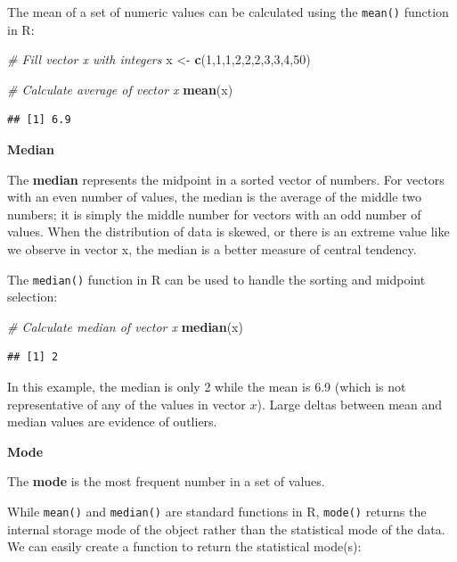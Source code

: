 \documentclass[]{book}
\newenvironment{Shaded}{\begin{snugshade}}{\end{snugshade}}
\newcommand{\CommentTok}[1]{\textcolor[rgb]{0.56,0.35,0.01}{\textit{#1}}}
\newcommand{\DecValTok}[1]{\textcolor[rgb]{0.00,0.00,0.81}{#1}}
\newcommand{\KeywordTok}[1]{\textcolor[rgb]{0.13,0.29,0.53}{\textbf{#1}}}
\newcommand{\NormalTok}[1]{#1}
\newcommand{\StringTok}[1]{\textcolor[rgb]{0.31,0.60,0.02}{#1}}
\begin{document}
The mean of a set of numeric values can be calculated using the \texttt{mean()} function in R:

\begin{Shaded}
\begin{Highlighting}[]
\CommentTok{# Fill vector x with integers}
\NormalTok{x <-}\StringTok{ }\KeywordTok{c}\NormalTok{(}\DecValTok{1}\NormalTok{,}\DecValTok{1}\NormalTok{,}\DecValTok{1}\NormalTok{,}\DecValTok{2}\NormalTok{,}\DecValTok{2}\NormalTok{,}\DecValTok{2}\NormalTok{,}\DecValTok{3}\NormalTok{,}\DecValTok{3}\NormalTok{,}\DecValTok{4}\NormalTok{,}\DecValTok{50}\NormalTok{)}

\CommentTok{# Calculate average of vector x}
\KeywordTok{mean}\NormalTok{(x)}
\end{Highlighting}
\end{Shaded}

\begin{verbatim}
## [1] 6.9
\end{verbatim}

\textbf{Median}

The \textbf{median} represents the midpoint in a sorted vector of numbers. For vectors with an even number of values, the median is the average of the middle two numbers; it is simply the middle number for vectors with an odd number of values. When the distribution of data is skewed, or there is an extreme value like we observe in vector x, the median is a better measure of central tendency.

The \texttt{median()} function in R can be used to handle the sorting and midpoint selection:

\begin{Shaded}
\begin{Highlighting}[]
\CommentTok{# Calculate median of vector x}
\KeywordTok{median}\NormalTok{(x)}
\end{Highlighting}
\end{Shaded}

\begin{verbatim}
## [1] 2
\end{verbatim}

In this example, the median is only 2 while the mean is 6.9 (which is not representative of any of the values in vector \(x\)). Large deltas between mean and median values are evidence of outliers.

\textbf{Mode}

The \textbf{mode} is the most frequent number in a set of values.

While \texttt{mean()} and \texttt{median()} are standard functions in R, \texttt{mode()} returns the internal storage mode of the object rather than the statistical mode of the data. We can easily create a function to return the statistical mode(s):
\end{document}

